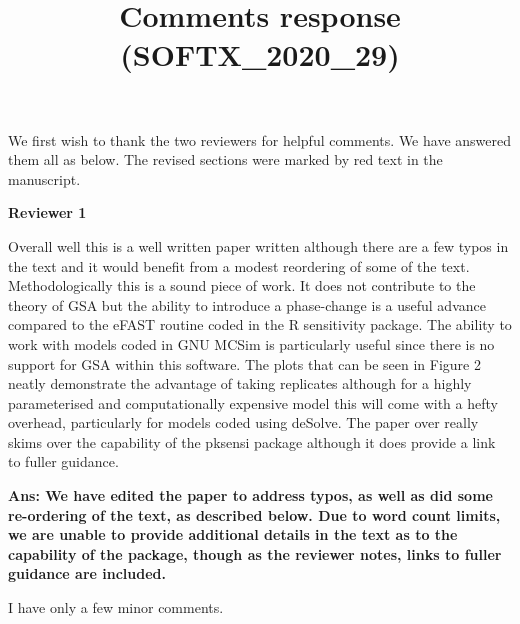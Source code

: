 \documentclass[
]{article}
\title{Comments response (SOFTX\_2020\_29)}
\author{}
\date{\vspace{-2.5em}}
\begin{document}
\maketitle

We first wish to thank the two reviewers for helpful comments. We have
answered them all as below. The revised sections were marked by red text
in the manuscript.

\textbf{Reviewer 1}

Overall well this is a well written paper written although there are a
few typos in the text and it would benefit from a modest reordering of
some of the text. Methodologically this is a sound piece of work. It
does not contribute to the theory of GSA but the ability to introduce a
phase-change is a useful advance compared to the eFAST routine coded in
the R sensitivity package. The ability to work with models coded in GNU
MCSim is particularly useful since there is no support for GSA within
this software. The plots that can be seen in Figure 2 neatly demonstrate
the advantage of taking replicates although for a highly parameterised
and computationally expensive model this will come with a hefty
overhead, particularly for models coded using deSolve. The paper over
really skims over the capability of the pksensi package although it does
provide a link to fuller guidance.

\textbf{Ans: We have edited the paper to address typos, as well as did
some re-ordering of the text, as described below. Due to word count
limits, we are unable to provide additional details in the text as to
the capability of the package, though as the reviewer notes, links to
fuller guidance are included.}

I have only a few minor comments.
\end{document}
